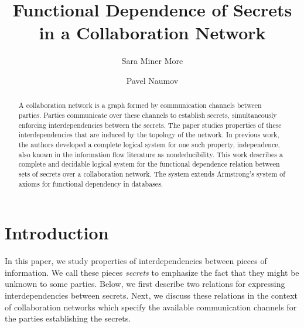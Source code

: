 \documentclass{llncs}
\begin{document}
\author{Sara Miner More \and Pavel Naumov}

\title{Functional Dependence of Secrets in a Collaboration Network}

\maketitle

\begin{abstract}
A collaboration network is a graph formed by communication channels between parties. Parties communicate over these channels
to establish secrets, simultaneously enforcing interdependencies between the secrets. The paper studies properties of these interdependencies that are induced by the topology of the network. In previous work, the authors developed a complete logical system for one such property, independence, also known in the information flow literature as nondeducibility.  This work describes a complete and decidable logical system for the functional dependence relation between sets of secrets over a collaboration network. The system extends Armstrong's system of axioms for functional dependency in databases.
\end{abstract}


\section{Introduction}
In this paper, we study properties of interdependencies between pieces of information. We call these pieces {\em secrets} to emphasize the fact that they might be unknown to some parties.  Below, we first describe two relations for expressing interdependencies between secrets.  Next, we discuss these relations in the context of collaboration networks which specify the available communication channels for the parties establishing the secrets.
\end{document}
